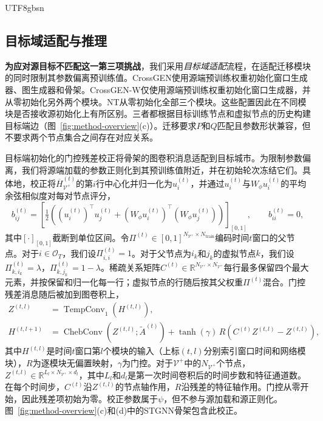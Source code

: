 \documentclass[runningheads,a4paper]{llncs}
\begin{document}
\begin{CJK*}{UTF8}{gbsn}
\subsection{目标域适配与推理}
\label{sec:target-adaptation}
\label{sec:optimization-inference}

\textbf{为应对源目标不匹配这一第三项挑战}，我们采用\emph{目标域适配}流程，在适配迁移模块的同时限制其参数偏离预训练值。CrossGEN使用源端预训练权重初始化窗口生成器、图生成器和骨架。CrossGEN-W仅使用源端预训练权重初始化窗口生成器，并从零初始化另外两个模块。NT从零初始化全部三个模块。这些配置因此在不同模块是否接收源初始化上有所区别。三者都根据目标训练节点和虚拟节点的历史构建目标端边（图~\ref{fig:method-overview}(c)）。迁移要求$P$和$Q$匹配且参数形状兼容，但不要求两个节点集合之间存在对应关系。

目标端初始化的门控残差校正将骨架的图卷积消息适配到目标城市。为限制参数偏离，我们将源端加载的参数正则化到其预训练值附近，并在初始轮次冻结它们。具体地，校正将$\overline H_{\mathcal V^{+}}^{(t)}$的第$i$行中心化并归一化为$u_i^{(t)}$，并通过$u_i^{(t)}$与$W_\phi u_i^{(t)}$的平均余弦相似度对每对节点评分，
\begin{equation}
  b_{ij}^{(t)}=\left[\tfrac12\left((u_i^{(t)})^\top u_j^{(t)}+(W_\phi u_i^{(t)})^\top(W_\phi u_j^{(t)})\right)\right]_{[0,1]},
  \qquad b_{ii}^{(t)}=0 ,
  \label{eq:correction-scores}
\end{equation}
其中$[\cdot]_{[0,1]}$截断到单位区间。令$\Pi^{(t)}\in[0,1]^{N_{\mathcal V^{+}}\times N_{\mathrm{train}}}$编码时间$t$窗口的父节点。对于$i\in\mathcal O_T$，我们设$\Pi_{i,i}^{(t)}=1$。对于父节点为$i_k$和$j_k$的虚拟节点$k$，我们设$\Pi_{k,i_k}^{(t)}=\lambda$，$\Pi_{k,j_k}^{(t)}=1-\lambda$。稀疏关系矩阵$C^{(t)}\in\mathbb R^{N_{\mathcal V^{+}}\times N_{\mathcal V^{+}}}$每行最多保留四个最大元素，并按保留和归一化每一行；虚拟节点的行随后按其父权重$\Pi^{(t)}$混合。门控残差消息随后被加到图卷积上，
\begin{equation}
\begin{aligned}
  Z^{(t,l)}&=\operatorname{TempConv}_1(H^{(t,l)}),\\
  H^{(t,l+1)}&=\operatorname{ChebConv}(Z^{(t,l)};\tilde A^{(t)})+\tanh(\gamma)\,R(C^{(t)}Z^{(t,l)}-Z^{(t,l)}),
\end{aligned}
  \label{eq:sparse-correction}
\end{equation}
其中$H^{(t,l)}$是时间$t$窗口第$l$个模块的输入（上标$(t,l)$分别索引窗口时间和网络模块），$R$为逐模块无偏置映射，$\gamma$为门控。对于$\mathcal V^{+}$中的$N_{\mathcal V^{+}}$个节点，$Z^{(t,l)}\in\mathbb R^{L_l\times N_{\mathcal V^{+}}\times d_l}$，其中$L_l$和$d_l$是第一次时间卷积后的时间步数和特征通道数。在每个时间步，$C^{(t)}$沿$Z^{(t,l)}$的节点轴作用，$R$沿残差的特征轴作用。门控从零开始，因此残差项初始为零。校正参数属于$\psi$，但不参与源加载和源正则化。图~\ref{fig:method-overview}(c)和(d)中的STGNN骨架包含此校正。


\end{CJK*}
\end{document}
